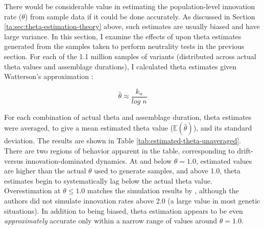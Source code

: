 There would be considerable value in estimating the population-level innovation rate ($\theta$) from sample data if it could be done accurately.  As discussed in Section \ref{ta:sec:theta-estimation-theory} above, such estimates are usually biased and have large variance.  In this section, I examine the effects of \timeav upon theta estimates generated from the samples taken to perform neutrality tests in the previous section.  For each of the 1.1 million samples of variants (distributed across actual theta values and assemblage durations), I calculated theta estimates given Watterson's approximation \citep{durrett2008}:

\begin{equation}
\label{eq:watterson-theta-est}
	\hat{\theta} \approx \frac{k_n}{log\;n}
\end{equation}

For each combination of actual theta and assemblage duration, theta estimates were averaged, to give a mean estimated theta value ($\mathbb{E}(\hat{\theta})$), and its standard deviation.  The results are shown in Table \ref{tab:estimated-theta-unaveraged}.   There are two regions of behavior apparent in the table, corresponding to drift- versus innovation-dominated dynamics.  At and below $\theta = 1.0$, estimated values are higher than the actual $\theta$ used to generate samples, and above 1.0, theta estimates begin to systematically lag below the actual theta value.  Overestimation at $\theta \leq 1.0$ matches the simulation results by \citet{ewens1974note}, although the authors did not simulate innovation rates above 2.0 (a large value in most genetic situations).  In addition to being biased, theta estimation appears to be even \emph{approximately} accurate only within a narrow range of values around $\theta = 1.0$.  


